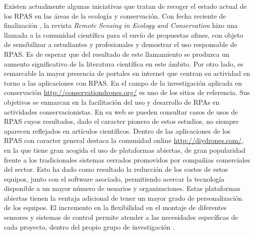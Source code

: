 \documentclass[9t,twocolumn]{article}
\begin{document}
Existen actualmente algunas iniciativas que tratan de recoger el estado
actual de los RPAS en las áreas de la ecología y conservación. Con fecha
reciente de finalización , la revista \emph{Remote Sensing in Ecology
and Conservation} hizo una llamada a la comunidad científica para el
envío de propuestas afines, con objeto de sensibilizar a estudiantes y
profesionales y demostrar el uso responsable de RPAS. Es de esperar que
del resultado de este llamamiento se produzca un aumento significativo
de la literatura científica en este ámbito. Por otro lado, es remarcable
la mayor presencia de portales en internet que centran su actividad en
torno a las aplicaciones con RPAS. En el campo de la investigación
aplicada en conservación \url{http://conservationdrones.org/} es uno de
los sitios de referencia. Sus objetivos se enmarcan en la facilitación
del uso y desarrollo de RPAs en actividades conservacionistas. En su web
se pueden consultar casos de usos de RPAS cuyos resultados, dado el
caracter pionero de estos estudios, no siempre aparecen reflejados en
artículos científicos. Dentro de las aplicaciones de los RPAS con
caracter general destaca la comunidad online
\url{http://diydrones.com/}, en la que tiene gran acogida el uso de
plataformas abiertas, de gran popularidad frente a los tradicionales
sistemas cerrados promovidos por compañias comerciales del sector. Esto
ha dado como resultado la reducción de los costes de estos equipos,
junto con el software asociado, permitiendo acercar la tecnología
disponible a un mayor número de usuarios y organizaciones. Estas
plataformas abiertas tienen la ventaja adicional de tener un mayor grado
de personalización de los equipos. El incremento en la flexibilidad en
el montaje de diferentes sensores y sistemas de control permite atender
a las necesidades específicas de cada proyecto, dentro del propio grupo
de investigación \citep{Koh2012}.
\end{document}
